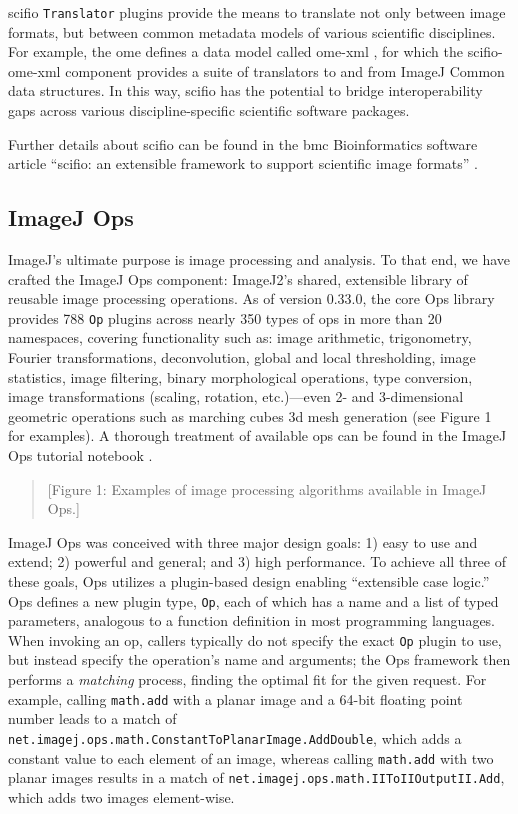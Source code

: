 \documentclass{bmcart}
\begin{document}
\acrshort{scifio} \texttt{Translator} plugins provide the means to translate
not only between image formats, but between common metadata models of various
scientific disciplines. For example, the \acrfull{ome} defines a data model
called \acrshort{ome}-\acrshort{xml} \cite{ome_xml}, for which the
\acrshort{scifio}-\acrshort{ome}-\acrshort{xml} component provides a suite of
translators to and from ImageJ Common data structures. In this way,
\acrshort{scifio} has the potential to bridge interoperability gaps across
various discipline-specific scientific software packages.

Further details about \acrshort{scifio} can be found in the \acrfull{bmc}
Bioinformatics software article ``\acrshort{scifio}: an extensible framework to
support scientific image formats'' \cite{scifio}.

\subsection*{ImageJ Ops}

ImageJ's ultimate purpose is image processing and analysis. To that end, we
have crafted the ImageJ Ops component: ImageJ2's shared, extensible library of
reusable image processing operations. As of version 0.33.0, the core Ops
library provides 788 \texttt{Op} plugins across nearly 350 types of ops in
more than 20 namespaces, covering functionality such as: image arithmetic,
trigonometry, Fourier transformations, deconvolution, global and local
thresholding, image statistics, image filtering, binary morphological
operations, type conversion, image transformations (scaling, rotation,
etc.)---even 2- and 3-dimensional geometric operations such as marching cubes
\acrshort{3d} mesh generation (see Figure 1 for examples). A thorough
treatment of available ops can be found in the ImageJ Ops tutorial notebook
\cite{imagej_notebooks}.

\begin{quote}
[Figure 1: Examples of image processing algorithms available in ImageJ Ops.]
\end{quote}

ImageJ Ops was conceived with three major design goals: 1) easy to use and
extend; 2) powerful and general; and 3) high performance. To achieve all three
of these goals, Ops utilizes a plugin-based design enabling ``extensible case
logic.'' Ops defines a new plugin type, \texttt{Op}, each of which has a name
and a list of typed parameters, analogous to a function definition in most
programming languages. When invoking an op, callers typically do not specify
the exact \texttt{Op} plugin to use, but instead specify the operation's name
and arguments; the Ops framework then performs a \textit{matching} process,
finding the optimal fit for the given request. For example, calling
\texttt{math.add} with a planar image and a 64-bit floating point number leads
to a match of \texttt{net.imagej.ops.math.ConstantToPlanarImage.AddDouble},
which adds a constant value to each element of an image, whereas calling
\texttt{math.add} with two planar images results in a match of
\texttt{net.imagej.ops.math.IIToIIOutputII.Add}, which adds two images
element-wise.
\end{document}
